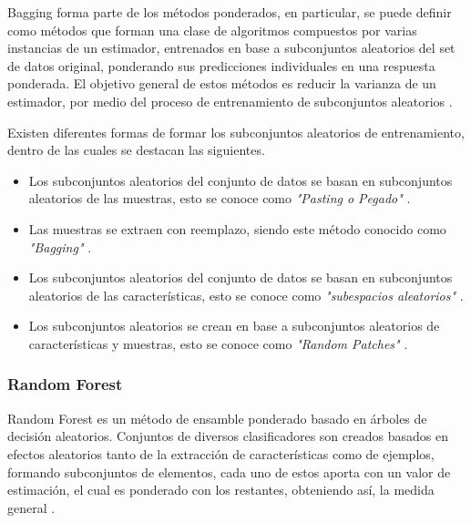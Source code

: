 Bagging forma parte de los métodos ponderados, en particular, se puede definir como métodos que forman una clase de algoritmos compuestos por varias instancias de un estimador, entrenados en base a subconjuntos aleatorios del set de datos original, ponderando sus predicciones individuales en una respuesta ponderada. El objetivo general de estos métodos es reducir la varianza de un estimador, por medio del proceso de entrenamiento de subconjuntos aleatorios \cite{breiman1996bagging}. 

Existen diferentes formas de formar los subconjuntos aleatorios de entrenamiento, dentro de las cuales se destacan las siguientes.

\begin{itemize}
	
	\item Los subconjuntos aleatorios del conjunto de datos se basan en subconjuntos aleatorios de las muestras, esto se conoce como \textit{"Pasting o Pegado"} \cite{breiman1999pasting}. 
	
	\item Las muestras se extraen con reemplazo, siendo este método conocido como \textit{"Bagging"} \cite{breiman1996bagging}.
	
	\item Los subconjuntos aleatorios del conjunto de datos se basan en subconjuntos aleatorios de las características, esto se conoce como \textit{"subespacios aleatorios"} \cite{barandiaran1998random}.
	
	\item Los subconjuntos aleatorios se crean en base a subconjuntos aleatorios de características y muestras, esto se conoce como \textit{"Random Patches"} \cite{ref10.1007/978-3-642-33460-3_28}.
	
\end{itemize}

\subsubsection{Random Forest}

Random Forest es un método de ensamble ponderado basado en árboles de decisión aleatorios. Conjuntos de diversos clasificadores son creados basados en efectos aleatorios tanto de la extracción de características como de ejemplos, formando subconjuntos de elementos, cada uno de estos aporta con un valor de estimación, el cual es ponderado con los restantes, obteniendo así, la medida general \cite{breiman1998}.

